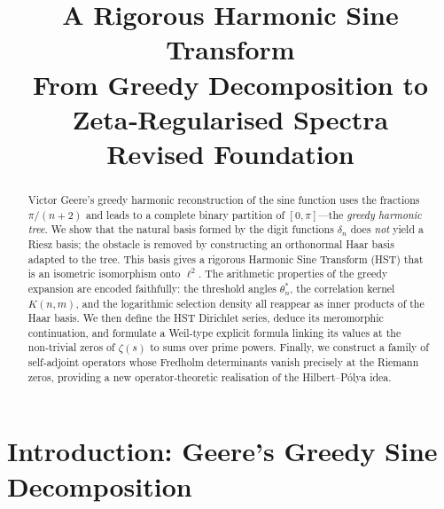 \documentclass[11pt,a4paper]{article}
\title{\bfseries A Rigorous Harmonic Sine Transform\\
\large From Greedy Decomposition to Zeta‑Regularised Spectra\\
\large Revised Foundation}
\author{}
\date{}
\theoremstyle{remark}
\begin{document}
\maketitle

\begin{abstract}
Victor Geere's greedy harmonic reconstruction of the sine function uses the fractions \(\pi/(n+2)\) and leads to a complete binary partition of \([0,\pi]\)—the \emph{greedy harmonic tree}. We show that the natural basis formed by the digit functions \(\delta_n\) does \emph{not} yield a Riesz basis; the obstacle is removed by constructing an orthonormal Haar basis adapted to the tree. This basis gives a rigorous Harmonic Sine Transform (HST) that is an isometric isomorphism onto \(\ell^2\). The arithmetic properties of the greedy expansion are encoded faithfully: the threshold angles \(\theta_n^*\), the correlation kernel \(K(n,m)\), and the logarithmic selection density all reappear as inner products of the Haar basis. We then define the HST Dirichlet series, deduce its meromorphic continuation, and formulate a Weil‑type explicit formula linking its values at the non‑trivial zeros of \(\zeta(s)\) to sums over prime powers. Finally, we construct a family of self‑adjoint operators whose Fredholm determinants vanish precisely at the Riemann zeros, providing a new operator‑theoretic realisation of the Hilbert–Pólya idea.
\end{abstract}

\tableofcontents

\section{Introduction: Geere's Greedy Sine Decomposition}
\end{document}
